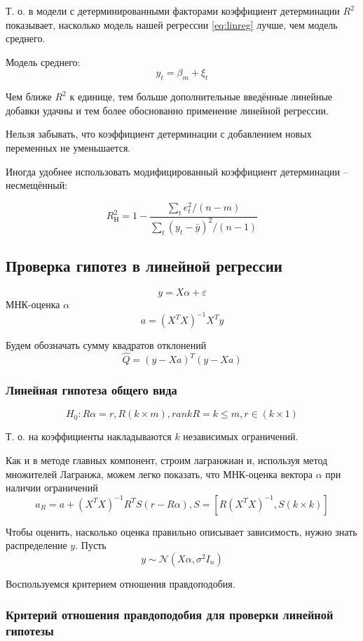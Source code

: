 \documentclass[main.tex]{subfiles}
\begin{document}
Т. о. в модели с детерминированными факторами коэффициент детерминации $ R^2 $ показывает, насколько модель нашей регрессии \eqref{eq:linreg} лучше, чем модель среднего.

Модель среднего:
$$ y_t = \beta_m + \xi_t $$

Чем ближе $ R^2 $ к единице, тем больше дополнительные введённые линейные добавки удачны и тем более обоснованно применение линейной регрессии.

Нельзя забывать, что коэффициент детерминации с добавлением новых переменных не уменьшается.

Иногда удобнее использовать модифицированный коэффициент детерминации -- несмещённый:

$$ R_{Н}^2 = 1 - \frac{\sum_t e_t^2 / (n-m)}{\sum_t (y_t - \bar y)^2 / (n-1)} $$

\subsection{Проверка гипотез в линейной регрессии}
$$ y = X \alpha + \varepsilon $$
МНК-оценка $ \alpha $
$$ a = (X^TX)^{-1}X^Ty $$

Будем обозначать сумму квадратов отклонений
$$ \hat Q = (y-Xa)^T (y-Xa) $$

\subsubsection{Линейная гипотеза общего вида}

$$ H_0: R\alpha=r, R(k\times m), rank R = k \le m, r \in (k \times 1)   $$

Т. о. на коэффициенты накладываются $ k $ независимых ограничений.

Как и в методе главных компонент, строим лагранжиан и, используя метод множителей Лагранжа, можем легко показать, что МНК-оценка вектора $ \alpha $ при наличии ограничений
$$ a_R = a + (X^TX)^{-1}R^TS(r-R\alpha), S = [R(X^TX)^{-1}, S(k\times k)] $$

Чтобы оценить, насколько оценка правильно описывает зависимость, нужно знать распределение $y$. Пусть
$$ y \sim \mathcal{N}(X\alpha, \sigma^2 I_n) $$

Воспользуемся критерием отношения правдоподобия.

\subsubsection{ Критерий отношения правдоподобия для проверки линейной гипотезы }
\end{document}
